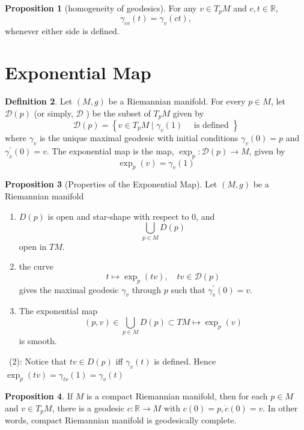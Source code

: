 \documentclass[12pt,a4paper]{book}
\newenvironment{prooff}{{\noindent\it\textcolor{cyan!40!black}{Proof}:}\,}{\par}
\newcommand{\bb}[1]{\mathbb{#1}}
\newenvironment{enu}{\begin{enumerate}[(1)]}{\end{enumerate}}
\theoremstyle{definition}
\newtheorem{defn}{Definition}[section]
\newtheorem{prop}[defn]{Proposition}
\begin{document}
\begin{prop}[homogeneity of geodesics]
    For any $v \in T_p M$ and $c,t \in \bb{R}$,
    $$
        \gamma_{cv}(t)=\gamma_v(c t),
    $$
    whenever either side is defined.
\end{prop}
\section{Exponential Map}
\begin{defn}
    Let $(M, g)$ be a Riemannian manifold. For every $p \in M$, let $\mathcal{D}(p)$ (or simply, $\mathcal{D}$ ) be the subset of $T_p M$ given by
    $$
        \mathcal{D}(p)=\left\{v \in T_p M \mid \gamma_v(1) \quad \text { is defined }\right\}
    $$
    where $\gamma_v$ is the unique maximal geodesic with initial conditions $\gamma_v(0)=p$ and $\gamma_v^{\prime}(0)=v$. The exponential map is the map, $\exp _p: \mathcal{D}(p) \rightarrow M$, given by
    $$
        \exp _p(v)=\gamma_v(1)
    $$
\end{defn}
\begin{prop}[Properties of the Exponential Map]
    Let $(M, g)$ be a Riemannian manifold
    \begin{enu}
        \item $D(p)$ is open and star-shape with respect to $0$, and $$\bigcup_{p\in M} D(p)$$ open in $TM$.
        \item the curve
        $$
            t \mapsto \exp _p(t v), \quad t v \in \mathcal{D}(p)
        $$
        gives the maximal geodesic $\gamma_v$ through $p$ such that $\gamma_v^{\prime}(0)=v$.
        \item The exponential map
        \begin{equation*}
            (p,v)\in \bigcup_{p\in M} D(p)\subset TM \mapsto \exp_p(v)
        \end{equation*}
        is smooth.
    \end{enu}
\end{prop}
\begin{prooff}
    (2): Notice that $tv\in D(p)$ iff $\gamma_v(t)$ is defined. Hence $ \exp _p(t v)=\gamma_{tv}(1)=\gamma_v(t)$
\end{prooff}
\begin{prop}
    If $M$ is a compact Riemannian manifold, then for each $p \in M$ and $v \in T_p M$, there is a geodesic $c: \mathbb{R} \rightarrow M$ with $c(0)=p, \dot{c}(0)=v$.
    In other words, compact Riemannian manifold is geodesically complete.
\end{prop}
\end{document}
